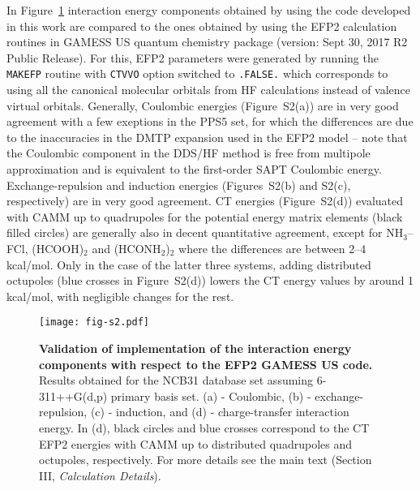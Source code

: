 \documentclass[aip,jcp,amsmath,amssymb,preprint,floatfix]{revtex4-1}
\begin{document}
In Figure~\ref{f:fig-s2} interaction energy components
obtained by using the code developed in this work are
compared to the ones obtained by using the EFP2 calculation routines
in GAMESS US quantum chemistry package\cite{GAMESS.JCC.1993} (version: Sept 30, 2017 R2 Public Release). 
For this, EFP2 parameters
were generated by running the \texttt{MAKEFP} routine
with \texttt{CTVVO} option switched to \texttt{.FALSE.} which corresponds
to using all the canonical molecular orbitals from HF calculations
instead of valence virtual orbitals.
Generally, Coulombic energies (Figure~S2(a)) 
are in very good agreement with a few exeptions in the PPS5 set,
for which the differences are due to the inaccuracies in the DMTP
expansion used in the EFP2 model -- note that the Coulombic component in the DDS/HF method
is free from multipole approximation and is equivalent to the first\hyp{}order SAPT Coulombic energy.
Exchange\hyp{}repulsion and induction energies (Figures~S2(b) and S2(c), respectively)
are in very good agreement. CT energies (Figure~S2(d)) 
evaluated with CAMM up to quadrupoles for the potential energy matrix elements (black filled circles)
are generally also in decent quantitative agreement,
except for NH$_3$--FCl, (HCOOH)$_2$ and (HCONH$_2$)$_2$ 
where the differences
are between 2--4 kcal/mol. Only in the case of the latter three systems,
adding distributed octupoles (blue crosses in Figure~S2(d)) 
lowers the CT energy values by around 1 kcal/mol,
with negligible changes for the rest.


%
\begin{figure}[h]
\texttt{[image: fig-s2.pdf]}
\caption{\label{f:fig-s2} {\bf Validation of implementation of the interaction energy components
with respect to the EFP2 GAMESS US code.} 
Results obtained for the NCB31 database set assuming 6-311++G(d,p) primary basis set. 
(a) - Coulombic, (b) - exchange-repulsion, (c) - induction, and (d) - charge-transfer
interaction energy. In (d), black circles and blue crosses correspond to the
CT EFP2 energies with CAMM up to distributed quadrupoles and octupoles, respectively.
For more details see the main text (Section III, \emph{Calculation Details}).
} 
\end{figure}
%



\end{document}
